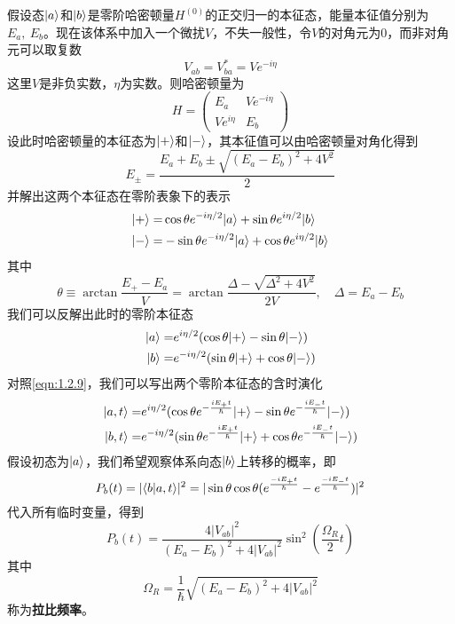 假设态$ |a\rangle $和$ |b\rangle $是零阶哈密顿量$ H^{(0)} $的正交归一的本征态，能量本征值分别为$ E_a,\ E_b $。现在该体系中加入一个微扰$ V $，不失一般性，令$ V $的对角元为0，而非对角元可以取复数
\begin{equation}\label{key}
V_{ab}=V_{ba}^*=Ve^{-i\eta}
\end{equation}
这里$ V $是非负实数，$ \eta $为实数。则哈密顿量为
\begin{equation}\label{key}
H=\begin{pmatrix}
E_a&Ve^{-i\eta}\\Ve^{i\eta}&E_b
\end{pmatrix}
\end{equation}
设此时哈密顿量的本征态为$ |+\rangle $和$ |-\rangle $，其本征值可以由哈密顿量对角化得到
\begin{equation}\label{key}
E_\pm=\dfrac{E_a+E_b\pm\sqrt{(E_a-E_b)^2+4V^2}}{2}
\end{equation}
并解出这两个本征态在零阶表象下的表示
\begin{align}
|+\rangle=&\cos\theta e^{-i\eta/2}|a\rangle+\sin\theta e^{i\eta/2}|b\rangle\\
|-\rangle=&-\sin\theta e^{-i\eta/2}|a\rangle+\cos\theta e^{i\eta/2}|b\rangle
\end{align}
其中
\begin{equation}\label{key}
\theta\equiv\arctan\dfrac{E_+-E_a}{V}=\arctan\dfrac{\Delta-\sqrt{\Delta^2+4V^2}}{2V},\quad \Delta=E_a-E_b
\end{equation}
我们可以反解出此时的零阶本征态
\begin{align}
|a\rangle=&e^{i\eta/2}(\cos\theta|+\rangle-\sin\theta|-\rangle)\\
|b\rangle=&e^{-i\eta/2}(\sin\theta|+\rangle+\cos\theta|-\rangle)
\end{align}
对照\eqref{eqn:1.2.9}，我们可以写出两个零阶本征态的含时演化
\begin{align}
|a,t\rangle=&e^{i\eta/2}(\cos\theta e^{-\frac{iE_+t}{\hbar}}|+\rangle-\sin\theta e^{-\frac{iE_-t}{\hbar}}|-\rangle)\\
|b,t\rangle=&e^{-i\eta/2}(\sin\theta e^{-\frac{iE_+t}{\hbar}}|+\rangle+\cos\theta e^{-\frac{iE_-t}{\hbar}}|-\rangle)
\end{align}
假设初态为$ |a\rangle $，我们希望观察体系向态$ |b\rangle $上转移的概率，即
\begin{equation}\label{key}
P_b(t)=|\langle b|a,t\rangle|^2=|\sin\theta\cos\theta(e^{\frac{-iE_+t}{\hbar}}-e^{\frac{-iE_-t}{\hbar}})|^2
\end{equation}
代入所有临时变量，得到
\begin{equation}\label{key}
P_b(t)=\dfrac{4|V_{ab}|^2}{(E_a-E_b)^2+4|V_{ab}|^2}\sin^2\left(\dfrac{\Omega_R}{2}t\right)
\end{equation}
其中
\begin{equation}\label{key}
\Omega_R=\frac{1}{\hbar}\sqrt{(E_a-E_b)^2+4|V_{ab}|^2}
\end{equation}
称为\textbf{拉比频率}。